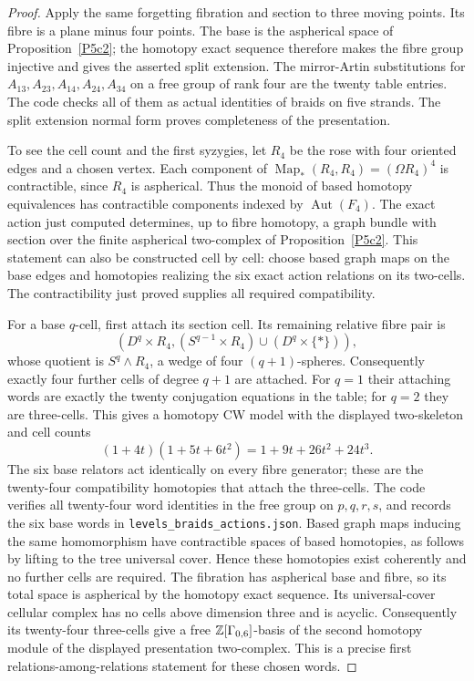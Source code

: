 \begin{proof}
Apply the same forgetting fibration and section to three
moving points.  Its fibre is a plane minus four points.
The base is the aspherical space of
Proposition~\ref{P5c2}; the homotopy exact sequence therefore
makes the fibre group injective and gives the asserted split
extension.  The mirror-Artin substitutions for
$A_{13},A_{23},A_{14},A_{24},A_{34}$ on a free group of rank four
are the twenty table entries.  The code checks all of them as
actual identities of braids on five strands.  The split
extension normal form proves completeness of the presentation.

To see the cell count and the first syzygies, let $R_4$ be the
rose with four oriented edges and a chosen vertex.  Each component of
$\operatorname{Map}_*(R_4,R_4)=(\Omega R_4)^4$ is contractible, since
$R_4$ is aspherical.  Thus the monoid of based homotopy equivalences
has contractible components indexed by $\operatorname{Aut}(F_4)$.
The exact action just computed determines, up to fibre homotopy, a
graph bundle with section over the finite aspherical two-complex of
Proposition~\ref{P5c2}.  This statement can also be constructed cell
by cell: choose based graph maps on the base edges and homotopies
realizing the six exact action relations on its two-cells.  The
contractibility just proved supplies all required compatibility.

For a base $q$-cell, first attach its section cell.  Its remaining
relative fibre pair is
\[
 (D^q\times R_4,
  (S^{q-1}\times R_4)\cup(D^q\times\{*\})),
\]
whose quotient is $S^q\wedge R_4$, a wedge of four
$(q+1)$-spheres.  Consequently exactly four further cells of degree
$q+1$ are attached.  For $q=1$ their attaching words are exactly the
twenty conjugation equations in the table; for $q=2$ they are
three-cells.  This gives a homotopy CW model with the displayed
two-skeleton and cell counts
\[
 (1+4t)(1+5t+6t^2)=1+9t+26t^2+24t^3.
\]
The six base relators act identically on every fibre generator;
these are the twenty-four compatibility homotopies that attach
the three-cells.  The code verifies all twenty-four word identities
in the free group on $p,q,r,s$, and records the six base words in
\texttt{levels\_braids\_actions.json}.  Based graph maps inducing the same homomorphism
have contractible spaces of based homotopies, as follows by
lifting to the tree universal cover.  Hence these homotopies
exist coherently and no further cells are required.  The
fibration has aspherical base and fibre, so its total space is
aspherical by the homotopy exact sequence.  Its universal-cover
cellular complex has no cells above dimension three and is
acyclic.  Consequently its twenty-four three-cells give a free
$\mathbb Z[\Gamma_{0,6}]$-basis of the second homotopy module of the
displayed presentation two-complex.  This is a precise first
relations-among-relations statement for these chosen words.
\end{proof}

